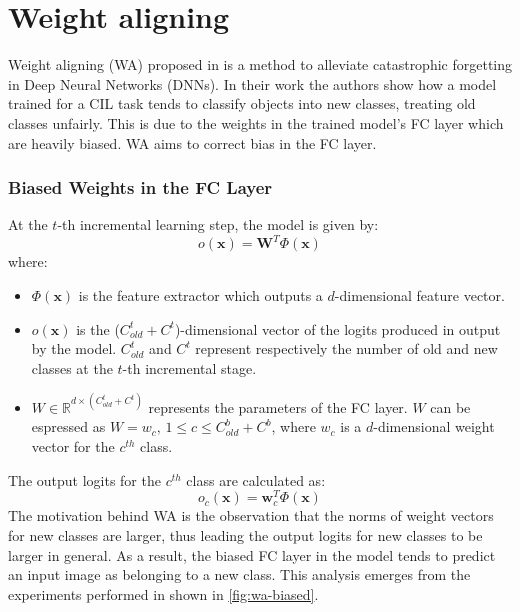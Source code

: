 \section{Weight aligning}
Weight aligning (WA) proposed in \cite{zhao2020maintaining} is a method to alleviate catastrophic forgetting in Deep Neural Networks (DNNs). In their work the authors show how a model trained for a CIL task tends
to classify objects into new classes, treating old classes unfairly. This is due to the weights
in the trained model's FC layer which are heavily biased. WA aims to correct bias in the FC layer.

\subsubsection{Biased Weights in the FC Layer}
\label{sec:wa-biased}
At the $t$-th incremental learning step, the model is given by:
\begin{equation}
    o(\textbf{x}) = \textbf{W}^T \Phi(\textbf{x})
\end{equation}
where:
\begin{itemize}
    \item $\Phi(\textbf{x})$ is the feature extractor which outputs a $d$-dimensional feature vector.
    \item $o(\textbf{x})$ is the ($C_{old}^t + C^t$)-dimensional vector of the logits produced in output by the model. $C_{old}^t$ and $C^t$ represent respectively the number of old and new classes at the $t$-th incremental stage. 
    \item $W \in \mathbb{R}^{d \times (C_{old}^t + C^t)}$ represents the parameters of the FC layer. $W$ can be espressed as $W = {w_c, \, 1 \leq c \leq C_{old}^b + C^b}$, where $w_c$ is a $d$-dimensional weight vector for the $c^{th}$ class.
\end{itemize}
The output logits for the $c^{th}$ class are calculated as:
\begin{equation}
    o_c(\textbf{x}) = \textbf{w}_c^T \Phi (\textbf{x})
\end{equation}
The motivation behind WA is the observation that the norms of weight vectors for new classes are larger, thus leading the output logits for new classes to be larger in general. As a result, the biased FC layer in the model tends to predict an input image as belonging to a new class. This analysis emerges from the experiments performed in \cite{zhao2020maintaining} shown in \autoref{fig:wa-biased}.
